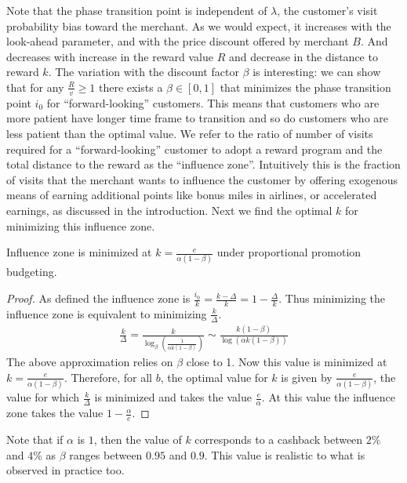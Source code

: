 Note that the phase transition point is independent of $\lambda$, the customer's visit probability bias toward the merchant.
As we would expect, it increases with the look-ahead parameter, and with the price discount offered by merchant $B$.
And decreases with increase in the reward value $R$ and decrease in the distance to reward $k$.
The variation with the discount factor $\beta$ is interesting: we can show that for any $\frac{R}{v} \ge 1$ there exists a $\beta \in [0,1]$ that minimizes the phase transition point $i_0$ for ``forward-looking'' customers.
This means that customers who are more patient have longer time frame to transition and so do customers who are less patient than the optimal value.
We refer to the ratio of number of visits required for a ``forward-looking'' customer to adopt a reward program and the total distance to the reward as the ``influence zone''.
Intuitively this is the fraction of visits that the merchant wants to influence the customer by offering exogenous means of earning additional points like bonus miles in airlines, or accelerated earnings, as discussed in the introduction.
Next we find the optimal $k$ for minimizing this influence zone.

\begin{remark}\label{rem:inf_zone}
Influence zone is minimized at $k = \frac{e}{\alpha(1-\beta)}$ under proportional promotion budgeting. 
\end{remark}
\begin{proof}
As defined the influence zone is $\frac{i_0}{k} = \frac{k-\Delta}{k} = 1 -\frac{\Delta}{k}$.
Thus minimizing the influence zone is equivalent to minimizing $\frac{k}{\Delta}$.
\begin{align*}
\frac{k}{\Delta} = \frac{k}{\log_\beta\left(\frac{1}{\alpha k(1-\beta)}\right)} \sim \frac{k(1-\beta)}{\log (\alpha k(1-\beta))} 
\end{align*}
The above approximation relies on $\beta$ close to 1. Now this value is minimized at $k = \frac{e}{\alpha(1-\beta)}$. Therefore, for all $b$, the optimal value for $k$ is given by $\frac{e}{\alpha(1-\beta)}$, the value for which $\frac{k}{\Delta}$ is minimized and takes the value $\frac{e}{\alpha}$. 
At this value the influence zone takes the value $1-\frac{\alpha}{e}$.
\end{proof}
Note that if $\alpha$ is $1$, then the value of $k$ corresponds to a cashback between $2$\% and $4$\% as $\beta$ ranges between $0.95$ and $0.9$.
This value is realistic to what is observed in practice too.

